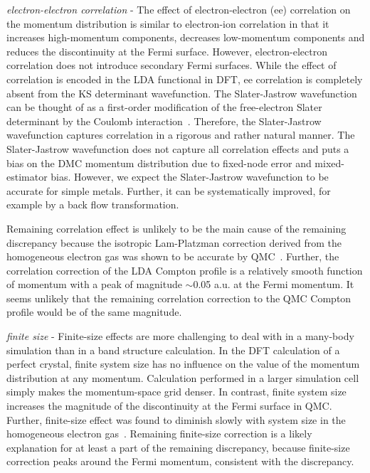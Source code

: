 \documentclass[aps,prb,showpacs,preprintnumbers,amsmath,amssymb,superscriptaddress,twocolumn]{revtex4}
\begin{document}
\emph{electron-electron correlation} - The effect of electron-electron (ee) correlation on the momentum distribution is similar to electron-ion correlation in that it increases high-momentum components, decreases low-momentum components and reduces the discontinuity at the Fermi surface. However, electron-electron correlation does not introduce secondary Fermi surfaces. While the effect of correlation is encoded in the LDA functional in DFT, ee correlation is completely absent from the KS determinant wavefunction. The Slater-Jastrow wavefunction can be thought of as a first-order modification of the free-electron Slater determinant by the Coulomb interaction~\cite{Holzmann2003}. Therefore, the Slater-Jastrow wavefunction captures correlation in a rigorous and rather natural manner. The Slater-Jastrow wavefunction does not capture all correlation effects and puts a bias on the DMC momentum distribution due to fixed-node error and mixed-estimator bias. However, we expect the Slater-Jastrow wavefunction to be accurate for simple metals. Further, it can be systematically improved, for example by a back flow transformation.

Remaining correlation effect is unlikely to be the main cause of the remaining discrepancy because the isotropic Lam-Platzman correction derived from the homogeneous electron gas was shown to be accurate by QMC~\cite{Filippi1999,Bross2005}. Further, the correlation correction of the LDA Compton profile is a relatively smooth function of momentum with a peak of magnitude $\sim$0.05 a.u. at the Fermi momentum. It seems unlikely that the remaining correlation correction to the QMC Compton profile would be of the same magnitude.


\emph{finite size} - Finite-size effects are more challenging to deal with in a many-body simulation than in a band structure calculation. In the DFT calculation of a perfect crystal, finite system size has no influence on the value of the momentum distribution at any momentum. Calculation performed in a larger simulation cell simply makes the momentum-space grid denser. In contrast, finite system size increases the magnitude of the discontinuity at the Fermi surface in QMC. Further, finite-size effect was found to diminish slowly with system size in the homogeneous electron gas~\cite{Holzmann2009}. Remaining finite-size correction is a likely explanation for at least a part of the remaining discrepancy, because finite-size correction peaks around the Fermi momentum, consistent with the discrepancy.
\end{document}
